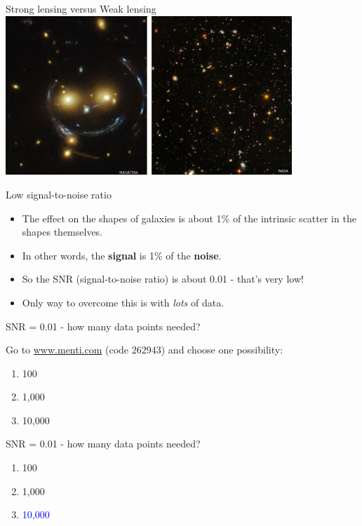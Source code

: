 \documentclass[usenames,dvipsnames]{beamer}
\newcommand{\mentiurl}[0]{{\url{www.menti.com}}}
\newcommand{\menticode}[0]{{262943}}
\newcommand{\mentiinvitation}[0]{Go to \mentiurl{} (code \menticode{}) and choose one possibility:\\}
\newcommand{\correctanswer}[1]{\textcolor{blue}{{#1} \checkmark}}
\begin{document}
\begin{frame}{Strong lensing versus Weak lensing}
    \centering
    \includegraphics[height=6cm]{diagram_4.png}
\end{frame}

\begin{frame}{Low signal-to-noise ratio}
  \begin{block}{}
    \begin{itemize}
      \item{The effect on the shapes of galaxies is about 1\% of the intrinsic scatter in the shapes themselves.}
      \item{In other words, the \textbf{signal} is 1\% of the \textbf{noise}.}
      \item{So the SNR (signal-to-noise ratio) is about 0.01  - that's very low!}
      \item{Only way to overcome this is with \textit{lots} of data.}
    \end{itemize}
  \end{block}
\end{frame}

\begin{frame}{SNR = 0.01 - how many data points needed?}
  \begin{block}{}
    \mentiinvitation{}
    \begin{enumerate}
      \item{100}
      \item{1,000}
      \item{10,000}
    \end{enumerate}
  \end{block}
\end{frame}

\begin{frame}{SNR = 0.01 - how many data points needed?}
  \begin{block}{}
    \begin{enumerate}
      \item{100}
      \item{1,000}
      \item{\correctanswer{10,000}}
    \end{enumerate}
  \end{block}
\end{frame}
\end{document}
